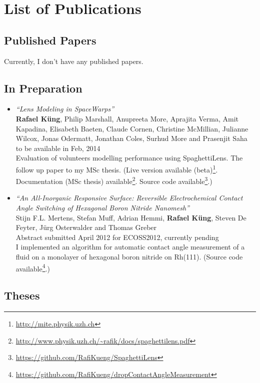 \documentclass[12pt]{article}
\begin{document}
\pagestyle{empty}

\section*{List of Publications}

\subsection{Published Papers}
Currently, I don't have any published papers.

\subsection{In Preparation}

\begin{itemize}
\item
  \emph{``Lens Modeling in SpaceWarps''}\\
  {\bf Rafael Küng}, Philip Marshall, Anupreeta More, Aprajita Verma, Amit Kapadina, Elisabeth Baeten, Claude Cornen, Christine McMillian, Julianne Wilcox, Jonas Odermatt, Jonathan Coles, Surhud More and Prasenjit Saha\\
  {\small
  to be available in Feb, 2014\\
  Evaluation of volunteers modelling performance using SpaghettiLens. The follow up paper to my MSc thesis.
  (Live version available (beta)\footnote{\url{http://mite.physik.uzh.ch}}.
  Documentation (MSc thesis) available\footnote{\url{http://www.physik.uzh.ch/~rafik/docs/spaghettilens.pdf}}.
  Source code available\footnote{\url{https://github.com/RafiKueng/SpaghettiLens}}.)
  }
  
\item
  \emph{``An All-Inorganic Responsive Surface: Reversible Electrochemical Contact Angle Switching of Hexagonal Boron Nitride Nanomesh''}\\
  Stijn F.L. Mertens, Stefan Muff, Adrian Hemmi, {\bf Rafael Küng}, Steven De Feyter, Jürg Osterwalder and Thomas Greber\\
  {\small
  Abstract submitted April 2012 for ECOSS2012, currently pending\\
  I implemented an algorithm for automatic contact angle measurement of a fluid on a monolayer of hexagonal boron nitride on Rh(111).
  (Source code available\footnote{\url{https://github.com/RafiKueng/dropContactAngleMeasurement}}.)
  }
\end{itemize}

\subsection{Theses}
\end{document}
